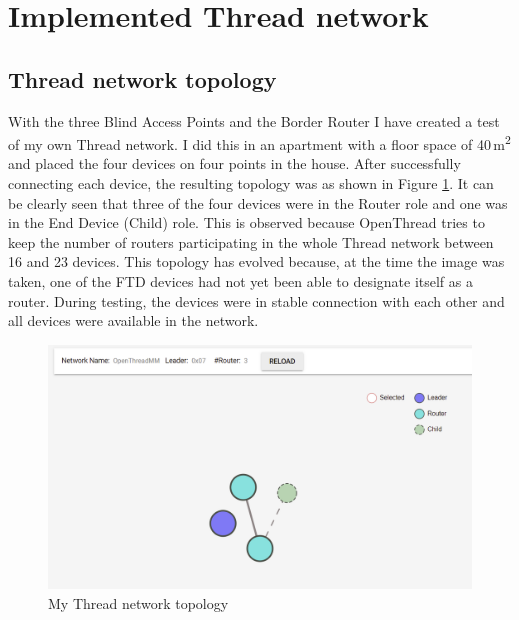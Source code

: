 \clearpage
\section{Implemented Thread network}

\subsection{Thread network topology}
With the three Blind Access Points and the Border Router I have created a test of my own Thread network. I did this in an apartment with a floor space of 40\,\si{\metre\squared} and placed the four devices on four points in the house. After successfully connecting each device, the resulting topology was as shown in Figure \ref{fig:topology}. It can be clearly seen that three of the four devices were in the Router role and one was in the End Device (Child) role. This is observed because OpenThread tries to keep the number of routers participating in the whole Thread network between 16 and 23 devices. This topology has evolved because, at the time the image was taken, one of the FTD devices had not yet been able to designate itself as a router. During testing, the devices were in stable connection with each other and all devices were available in the network.
\begin{figure}[!htb]
    \centering
    \includegraphics[width=\textwidth]{img/topologia.png}
    \caption{My Thread network topology}
    \label{fig:topology}
\end{figure}

\pagebreak
